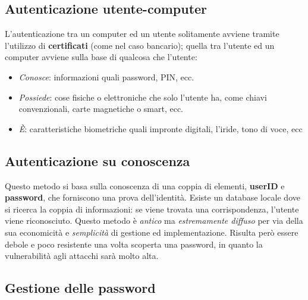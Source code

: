 \subsection{Autenticazione utente-computer}

L'autenticazione tra un computer ed un utente solitamente avviene tramite
l'utilizzo di \textbf{certificati} (come nel caso bancario); quella tra l'utente
ed un computer avviene sulla base di qualcosa che l'utente:

\begin{itemize}
      \item \textit{Conosce}: informazioni quali password, PIN, ecc.
      \item \textit{Possiede}: cose fisiche o elettroniche che solo l'utente ha,
            come chiavi convenzionali, carte magnetiche o smart, ecc.
      \item \textit{È}: caratteristiche biometriche quali
            impronte digitali, l'iride, tono di voce, ecc
\end{itemize}

\subsection{Autenticazione su conoscenza}

Questo metodo si basa sulla conoscenza di una coppia di elementi, \textbf{userID}
e \textbf{password}, che forniscono una prova dell'identità.
Esiste un database locale dove si ricerca la coppia di informazioni:
se viene trovata una corrispondenza, l'utente viene riconosciuto.
Questo metodo è \textit{antico} ma \textit{estremamente diffuso} per via della sua
economicità e \textit{semplicità} di gestione ed implementazione.
Risulta però essere debole e poco resistente una volta scoperta una password,
in quanto la vulnerabilità agli attacchi sarà molto alta.

\subsection{Gestione delle password}

